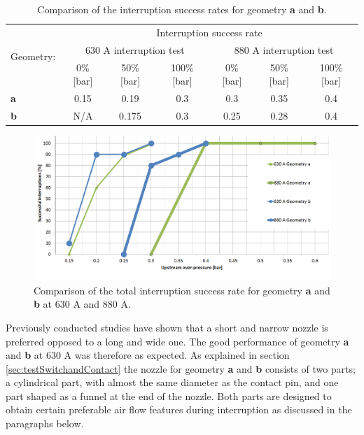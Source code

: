 \documentclass[10pt,b5paper,twoside]{article}
\begin{document}
\begin{table}[h]
\center
\caption{Comparison of the interruption success rates for geometry \textbf{a} and \textbf{b}.}
\begin{tabular}{|l|c|c|c|c|c|c|}
\hline
\multirow{3}{*}{Geometry:} & \multicolumn{6}{|c|}{Interruption success rate}                                                           \\ \cline{2-7} 
                          & \multicolumn{3}{|c}{630 A interruption test}        & \multicolumn{3}{|c|}{880 A interruption test}       \\ \cline{2-7} 
                          & 0\% {[}bar{]} & 50\% {[}bar{]} & 100\% {[}bar{]} & 0\% {[}bar{]} & 50\% {[}bar{]} & 100\% {[}bar{]} \\ \hline
\textbf{a}                & 0.15           & 0.19            & 0.3              & 0.3            & 0.35            & 0.4              \\ \hline
\textbf{b}                & N/A            & 0.175           & 0.3              & 0.25           & 0.28            & 0.4              \\ \hline
\end{tabular}
\label{tab:compgeoAandB}
\end{table}

\begin{figure}[H]
\centering
\includegraphics[scale=0.5, angle =90 ]{Bilder/Results/compGeoAandBNew2.PNG}
\caption{Comparison of the total interruption success rate for geometry \textbf{a} and \textbf{b} at 630 A and 880 A.} \label{fig:compgeoAandBAllcurrents}
\end{figure}

Previously conducted studies have shown that a short and narrow nozzle is preferred opposed to a long and wide one. The good performance of geometry \textbf{a} and \textbf{b} at 630 A was therefore as expected. As explained in section \ref{sec:testSwitchandContact} the nozzle for geometry \textbf{a} and \textbf{b} consists of two parts; a cylindrical part, with almost the same diameter as the contact pin, and one part shaped as a funnel at the end of the nozzle. Both parts are designed to obtain certain preferable air flow features during interruption as discussed in the paragraphs below.
\end{document}
